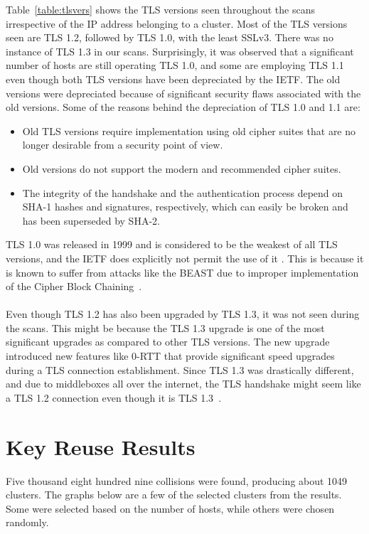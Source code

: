 \noindent Table~\ref*{table:tlsvers} shows the TLS versions seen throughout the scans irrespective of the IP address belonging to a cluster. Most of the TLS versions 
seen are TLS 1.2, followed by TLS 1.0, with the least SSLv3. There was no instance of TLS 1.3 in our scans. Surprisingly, it was observed 
that a significant number of hosts are still operating TLS 1.0, and some are employing TLS 1.1 even though both TLS versions have been depreciated by the 
IETF. The old versions were depreciated because of significant security flaws associated with the old versions. Some of the reasons behind 
the depreciation of TLS 1.0 and 1.1 are:
\begin{itemize}
    \item Old TLS versions require implementation using old cipher suites that are no longer desirable from a security point of view.
    \item Old versions do not support the modern and recommended cipher suites.
    \item The integrity of the handshake and the authentication process depend on SHA-1 hashes and signatures, respectively, which can easily be broken and has been superseded by SHA-2. 
\end{itemize} 
\noindent TLS 1.0 was released in 1999 and is considered to be the weakest of all TLS versions, and the IETF does explicitly not permit the use of it \cite{rfc8996}. 
This is because it is known to suffer from attacks like the BEAST due to improper implementation of the Cipher Block Chaining~\cite{rfc7457}.\\\\
Even though TLS 1.2 has also been upgraded by TLS 1.3, it was not seen during the scans. 
This might be because the TLS 1.3 upgrade is one of the most significant upgrades as compared to other TLS versions. The new upgrade introduced 
new features like 0-RTT that provide significant speed upgrades during a TLS connection establishment. Since TLS 1.3 was drastically different,
and due to middleboxes all over the internet, the TLS handshake might seem like a TLS 1.2 connection even though it is TLS 1.3~\cite{rfc8446}. 

\section{Key Reuse Results}
Five thousand eight hundred nine collisions were found, producing about 1049 clusters. The graphs below are a few of the selected clusters from 
the results. Some were selected based on the number of hosts, while others were chosen randomly.

